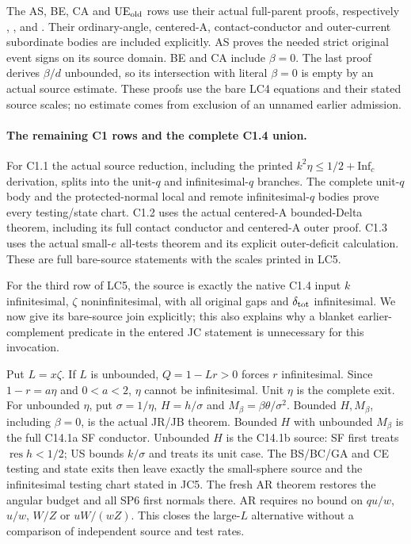 The AS, BE, CA and \({\rm UE}_{\rm old}\) rows use their actual
full-parent proofs, respectively
,
,
 and
.
Their ordinary-angle, centered-A, contact-conductor and
outer-current subordinate bodies are included explicitly.
AS proves the needed strict original event signs on its source
domain.  BE and CA include \(\beta=0\).
The last proof derives \(\beta/d\) unbounded, so its intersection
with literal \(\beta=0\) is empty by an actual source estimate.
These proofs use the bare LC4 equations and their stated source
scales; no estimate comes from exclusion of an unnamed earlier
admission.

\paragraph{The remaining C1 rows and the complete C1.4 union.}
For C1.1 the actual source reduction, including the printed
\(k^2\eta\leq1/2+\mathrm{Inf}_c\) derivation, splits into
the unit-\(q\) and infinitesimal-\(q\) branches.  The complete
unit-\(q\) body and the protected-normal local and remote
infinitesimal-\(q\) bodies prove every testing/state chart.
C1.2 uses the actual centered-A bounded-Delta theorem, including
its full contact conductor and centered-A outer proof.
C1.3 uses the actual small-\(e\) all-tests theorem and its
explicit outer-deficit calculation.  These are full bare-source
statements with the scales printed in LC5.

For the third row of LC5, the source is exactly the native
C1.4 input \(k\) infinitesimal, \(\zeta\) noninfinitesimal,
with all original gaps and \(\delta_{\rm tot}\) infinitesimal.
We now give its bare-source join explicitly; this also explains
why a blanket earlier-complement predicate in the entered JC
statement is unnecessary for this invocation.

Put \(L=x\zeta\).  If \(L\) is unbounded, \(Q=1-Lr>0\)
forces \(r\) infinitesimal.  Since \(1-r=a\eta\) and
\(0<a<2\), \(\eta\) cannot be infinitesimal.
Unit \(\eta\) is the complete 
exit.  For unbounded \(\eta\), put
\(\sigma=1/\eta\), \(H=h/\sigma\) and
\(M_\beta=\beta\theta/\sigma^2\).
Bounded \(H,M_\beta\), including \(\beta=0\), is the actual
JR/JB theorem.  Bounded \(H\) with unbounded \(M_\beta\)
is the full C14.1a SF conductor.  Unbounded \(H\) is
the C14.1b source: SF first treats \(\operatorname{res}h<1/2\);
US bounds \(k/\sigma\) and treats its unit case.
The BS/BC/GA and CE testing and state exits then leave
exactly the small-sphere source and the infinitesimal
testing chart stated in JC5.  The fresh AR theorem restores
the angular budget and all SP6 first normals there.
AR requires no bound on \(qu/w\), \(u/w\), \(W/Z\) or
\(uW/(wZ)\).  This closes the large-\(L\) alternative
without a comparison of independent source and test rates.

